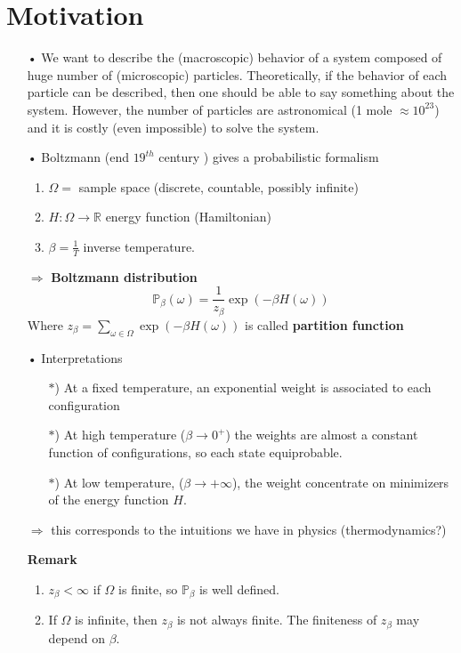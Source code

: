 \documentclass[12pt,a4paper]{report}
\theoremstyle{definition}
\begin{document}
\section{Motivation}
\begin{enumerate}
    \item[•] We want to describe the (macroscopic) behavior of a system composed of huge number of (microscopic) particles. Theoretically, if the behavior of each particle can be described, then one should be able to say something about the system. However, the number of particles are astronomical (1 mole $\approx 10^{23}$) and it is costly (even impossible) to solve the system.
    \item[•] Boltzmann (end $19^{th}$ century ) gives a probabilistic formalism
    \begin{enumerate}
        \item $\Omega=$ sample space (discrete, countable, possibly infinite)
        \item $H:\Omega\to\mathbb{R}$ energy function (Hamiltonian) 
        \item $\beta=\frac{1}{T}$ inverse temperature.
    \end{enumerate}
    $\Rightarrow$ \textbf{Boltzmann distribution} 
    \[
    \mathbb{P}_{\beta}(\omega)=\frac{1}{z_\beta}\exp(-\beta H(\omega))
    \]
    Where $z_\beta=\sum\limits_{\omega\in\Omega}\exp(-\beta H(\omega))$ is called \textbf{partition function} 
    \item[•] Interpretations
    \begin{enumerate}
        \item[$*$)] At a fixed temperature, an exponential weight is associated to each configuration
        \item[$*$)] At high temperature ($\beta\to 0^+$) the weights are almost a constant function of configurations, so each state equiprobable.
        \item[$*$)] At low temperature, ($\beta\to +\infty$), the weight concentrate on minimizers of the energy function $H.$ 
    \end{enumerate}
    $\Rightarrow$ this corresponds to the intuitions we have in physics (thermodynamics?)
    \newpage
    \item[\textbf{Remark}] \begin{enumerate}
        \item $z_\beta<\infty$ if $\Omega$ is finite, so $\mathbb{P}_\beta$ is well defined.
        \item If $\Omega$ is infinite, then $z_\beta$ is not always finite. The finiteness of $z_\beta$ may depend on $\beta.$
    \end{enumerate}
\end{enumerate}
\newpage
\end{document}
